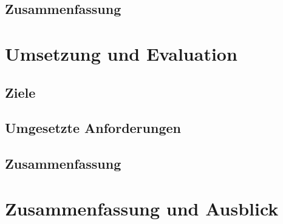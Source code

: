 \documentclass[a4paper]{article}
\begin{document}
\subsection{Zusammenfassung}

\newpage
\section{Umsetzung und Evaluation}

\subsection{Ziele}

\subsection{Umgesetzte Anforderungen}

\subsection{Zusammenfassung}

\newpage
\section{Zusammenfassung und Ausblick}
\end{document}
